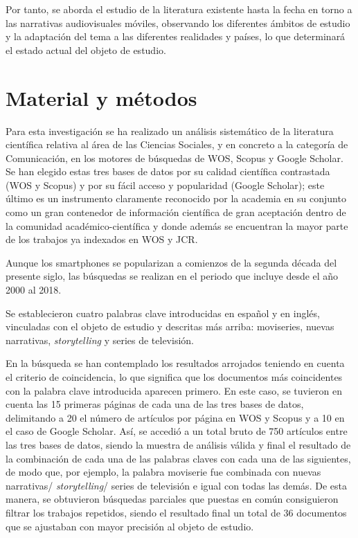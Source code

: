 \documentclass[spanish]{textolivre}
\begin{document}
Por tanto, se aborda el estudio de la literatura existente hasta la fecha en torno a las narrativas audiovisuales móviles, observando los diferentes ámbitos de estudio y la adaptación del tema a las diferentes realidades y países, lo que determinará el estado actual del objeto de estudio. 

\section{Material y métodos}
Para esta investigación se ha realizado un análisis sistemático de la literatura científica relativa al área de las Ciencias Sociales, y en concreto a la categoría de Comunicación, en los motores de búsquedas de WOS, Scopus y Google Scholar. Se han elegido estas tres bases de datos por su calidad científica contrastada (WOS y Scopus) y por su fácil acceso y popularidad (Google Scholar); este último es un instrumento claramente reconocido por la academia en su conjunto como un gran contenedor de información científica de gran aceptación dentro de la comunidad académico-científica \cite{maldonadomartinez2017} y donde además se encuentran la mayor parte de los trabajos ya indexados en WOS y JCR.

Aunque los smartphones se popularizan a comienzos de la segunda década del presente siglo, las búsquedas se realizan en el periodo que incluye desde el año 2000 al 2018. 

Se establecieron cuatro palabras clave introducidas en español y en inglés, vinculadas con el objeto de estudio y descritas más arriba: moviseries, nuevas narrativas, \emph{storytelling} y series de televisión. 

En la búsqueda se han contemplado los resultados arrojados teniendo en cuenta el criterio de coincidencia, lo que significa que los documentos más coincidentes con la palabra clave introducida aparecen primero. En este caso, se tuvieron en cuenta las 15 primeras páginas de cada una de las tres bases de datos, delimitando a 20 el número de artículos por página en WOS y Scopus y a 10 en el caso de Google Scholar. Así, se accedió a un total bruto de 750 artículos entre las tres bases de datos, siendo la muestra de análisis válida y final el resultado de la combinación de cada una de las palabras claves con cada una de las siguientes, de modo que, por ejemplo, la palabra moviserie fue combinada con nuevas narrativas/ \emph{storytelling}/ series de televisión e igual con todas las demás. De esta manera, se obtuvieron búsquedas parciales que puestas en común consiguieron filtrar los trabajos repetidos, siendo el resultado final un total de 36 documentos que se ajustaban con mayor precisión al objeto de estudio. 
\end{document}
